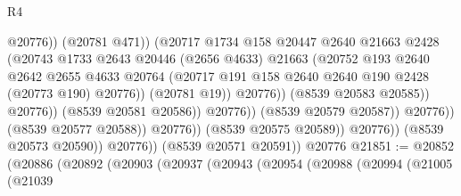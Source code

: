 \begin{lexlean}{R4}
\begin{coremodule}
                                                  @20776))
                                              (@20781 @471))
                                            (@20717
                                              @1734
                                              @158
                                              @20447
                                              @2640
                                              @21663
                                              @2428
                                              (@20743
                                                @1733
                                                @2643
                                                @20446
                                                (@2656 @4633)
                                                @21663
                                                (@20752
                                                  @193
                                                  @2640
                                                  @2642
                                                  @2655
                                                  @4633
                                                  @20764
                                                  (@20717
                                                    @191
                                                    @158
                                                    @2640
                                                    @2640
                                                    @190
                                                    @2428
                                                    (@20773 @190)
                                                    @20776))
                                                (@20781 @19))
                                              @20776))
                                          (@8539 @20583 @20585))
                                        @20776))
                                    (@8539 @20581 @20586))
                                  @20776))
                              (@8539 @20579 @20587))
                            @20776))
                        (@8539 @20577 @20588))
                      @20776))
                  (@8539 @20575 @20589))
                @20776))
            (@8539 @20573 @20590))
          @20776))
      (@8539 @20571 @20591))
    @20776
@21851 := @20852
    (@20886
      (@20892
        (@20903
          (@20937
            (@20943
              (@20954
                (@20988
                  (@20994
                    (@21005
                      (@21039

\end{coremodule}
\end{lexlean}

